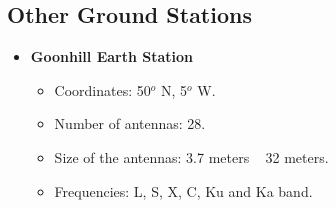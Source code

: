 \subsection{Other Ground Stations}
\begin{itemize}
\item \textbf{Goonhill Earth Station}
\begin{itemize}
\item Coordinates: 50$^{o}$ N, 5$^{o}$ W.
\item Number of antennas: 28.
\item Size of the antennas: 3.7 meters ~ 32 meters.
\item Frequencies: L, S, X, C, Ku and Ka band.
\end{itemize}
\end{itemize}